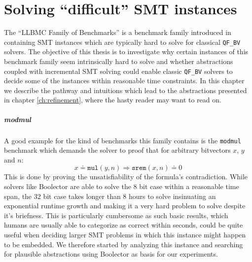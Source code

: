 \chapter{Solving \enquote{difficult} SMT instances}
\label{ch:solving_hard_smt}
\label{sec:solving_hard_smt:llbmc_benchmarks}
The \enquote{LLBMC Family of Benchmarks} is a benchmark family introduced in \cite{sc2017-proceedings} containing SMT instances which are typically hard to solve for classical \texttt{QF\_BV} solvers. The objective of this thesis is to investigate why certain instances of this benchmark family seem intrinsically hard to solve and whether abstractions coupled with incremental SMT solving could enable classic \texttt{QF\_BV} solvers to decide some of the instances within reasonable time constraints.
In this chapter we describe the pathway and intuitions which lead to the abstractions presented in chapter \ref{ch:refinement}, where the hasty reader may want to read on.

\paragraph{modmul}
A good example for the kind of benchmarks this family contains is the \texttt{modmul} benchmark which demands the solver to proof that for arbitrary bitvectors $x$, $y$ and $n$:
\[
x \doteq \texttt{mul}\left(y,n\right) \Rightarrow \texttt{srem}\left(x,n\right) \doteq 0
\]
This is done by proving the unsatisfiability of the formula's contradiction.
While solvers like Boolector are able to solve the 8 bit case within a reasonable time span, the 32 bit case takes longer than 8 hours to solve insinuating an exponential runtime growth and making it a very hard problem to solve despite it's briefness. This is particularly cumbersome as such basic results, which humans are usually able to categorize as correct within seconds, could be quite useful when deciding larger SMT problems in which this instance might happen to be embedded. We therefore started by analyzing this instance and searching for plausible abstractions using Boolector as basis for our experiments.


